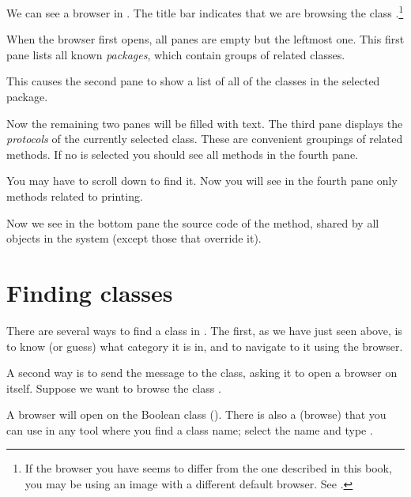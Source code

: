\documentclass[a4paper,10pt,twoside]{book}
\begin{document}
We can see a browser in .
The title bar indicates that we are browsing the class .\footnote{If the browser you have seems to differ from the one described in this book, you may be using an image with a different default browser. See .}

When the browser first opens, all panes are empty but the leftmost one.
This first pane lists all known \emph{packages}, which contain groups of related classes.

This causes the second pane to show a list of all of the classes in the selected package.

Now the remaining two panes will be filled with text.
The third pane displays the \emph{protocols} of the currently selected class.
These are convenient groupings of related methods.
If no  is selected you should see all methods in the fourth pane.

You may have to scroll down to find it.
Now you will see in the fourth pane only methods related to printing.

Now we see in the bottom pane the source code of the  method, shared by all objects in the system (except those that override it).

\section{Finding classes}

There are several ways to find a class in \pharo.  The first, as we have just seen above, is to know (or guess) what category it is in, and to navigate to it using the browser.

A second way is to send the  message to the class, asking it to open a browser on itself.  Suppose we want to browse the class .

A browser will open on the Boolean class ().
There is also a   (browse) that you can use in any tool where you find a class name;
select the name and type .
\end{document}
